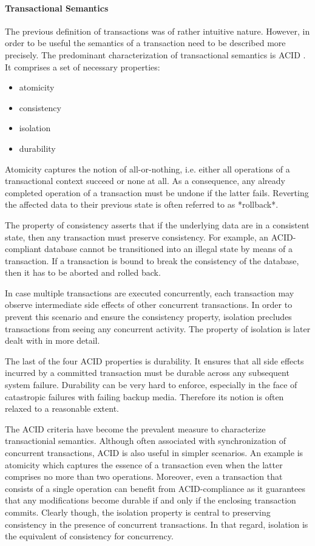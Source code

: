 \paragraph{Transactional Semantics}

The previous definition of transactions was of rather intuitive nature. However,
in order to be useful the semantics of a transaction need to be described more
precisely. The predominant characterization of transactional semantics is ACID
\cite{haerder1983}. It comprises a set of necessary properties:

\begin{itemize}
    \item atomicity
    \item consistency
    \item isolation
    \item durability
\end{itemize}

Atomicity captures the notion of all-or-nothing, i.e. either all operations of a
transactional context succeed or none at all. As a consequence, any already
completed operation of a transaction must be undone if the latter fails.
Reverting the affected data to their previous state is often referred to as
*rollback*.

The property of consistency asserts that if the underlying data are in a
consistent state, then any transaction must preserve consistency. For example,
an ACID-compliant database cannot be transitioned into an illegal state by means
of a transaction. If  a transaction is bound to break the consistency of the
database, then it has to be aborted and rolled back.

In case multiple transactions are executed concurrently, each transaction may
observe intermediate side effects of other concurrent transactions. In order to
prevent this scenario and ensure the consistency property, isolation precludes
transactions from seeing any concurrent activity. The property of isolation is
later dealt with in more detail.

The last of the four ACID properties is durability. It ensures that all side
effects incurred by a committed transaction must be durable across any
subsequent system failure. Durability can be very hard to enforce, especially in
the face of catastropic failures with failing backup media. Therefore its notion
is often relaxed to a reasonable extent.

The ACID criteria have become the prevalent measure to characterize
transactionial semantics. Although often associated with synchronization of
concurrent transactions, ACID is also useful in simpler scenarios. An example is
atomicity which captures the essence of a transaction even when the latter
comprises no more than two operations. Moreover, even a transaction that
consists of a single operation can benefit from ACID-compliance as it guarantees
that any modifications become durable if and only if the enclosing transaction
commits. Clearly though, the isolation property is central to preserving
consistency in the presence of concurrent transactions. In that regard,
isolation is the equivalent of consistency for concurrency.

